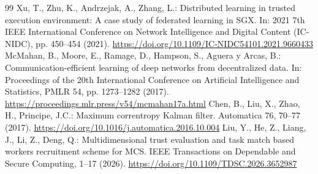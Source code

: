 \documentclass[runningheads,orivec]{llncs}
\begin{document}
\begin{thebibliography}{99}
     Xu, T., Zhu, K., Andrzejak, A., Zhang, L.: Distributed learning in trusted execution environment: A case study of federated learning in SGX. In: 2021 7th IEEE International Conference on Network Intelligence and Digital Content (IC-NIDC), pp. 450--454 (2021). \url{https://doi.org/10.1109/IC-NIDC54101.2021.9660433}
     McMahan, B., Moore, E., Ramage, D., Hampson, S., Aguera y Arcas, B.: Communication-efficient learning of deep networks from decentralized data. In: Proceedings of the 20th International Conference on Artificial Intelligence and Statistics, PMLR 54, pp. 1273--1282 (2017). \url{https://proceedings.mlr.press/v54/mcmahan17a.html}
     Chen, B., Liu, X., Zhao, H., Principe, J.C.: Maximum correntropy Kalman filter. Automatica 76, 70--77 (2017). \url{https://doi.org/10.1016/j.automatica.2016.10.004}
     Liu, Y., He, Z., Liang, J., Li, Z., Deng, Q.: Multidimensional trust evaluation and task match based workers recruitment scheme for MCS. IEEE Transactions on Dependable and Secure Computing, 1--17 (2026). \url{https://doi.org/10.1109/TDSC.2026.3652987}
\end{thebibliography}
\endgroup
\end{document}
